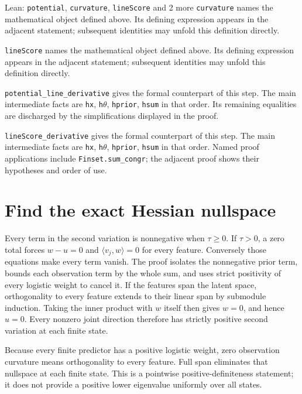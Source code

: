 \documentclass[11pt,a4paper]{article}
\begin{document}
\begin{leanbox}{Lean: \texttt{potential}, \texttt{curvature}, \texttt{lineScore} and 2 more}
\texttt{curvature} names the mathematical object defined above. Its defining expression appears in the adjacent statement; subsequent identities may unfold this definition directly.




\texttt{line\allowbreak{}Score} names the mathematical object defined above. Its defining expression appears in the adjacent statement; subsequent identities may unfold this definition directly.




\texttt{potential\_\allowbreak{}line\_\allowbreak{}derivative} gives the formal counterpart of this step. The main intermediate facts are \texttt{hx}, \texttt{h\ensuremath{\theta}}, \texttt{hprior}, \texttt{hsum} in that order. Its remaining equalities are discharged by the simplifications displayed in the proof.




\texttt{line\allowbreak{}Score\_\allowbreak{}derivative} gives the formal counterpart of this step. The main intermediate facts are \texttt{hx}, \texttt{h\ensuremath{\theta}}, \texttt{hprior}, \texttt{hsum} in that order. Named proof applications include \texttt{Finset.\allowbreak{}sum\_\allowbreak{}congr}; the adjacent proof shows their hypotheses and order of use.
\end{leanbox}

\section{\texorpdfstring{Find the exact Hessian nullspace}{Find the exact Hessian nullspace}}


Every term in the second variation is nonnegative when \(\tau\ge0\). If \(\tau>0\), a zero total forces \(w-u=0\) and \(\langle v_j,w\rangle=0\) for every feature. Conversely those equations make every term vanish. The proof isolates the nonnegative prior term, bounds each observation term by the whole sum, and uses strict positivity of every logistic weight to cancel it. If the features span the latent space, orthogonality to every feature extends to their linear span by submodule induction. Taking the inner product with \(w\) itself then gives \(w=0\), and hence \(u=0\). Every nonzero joint direction therefore has strictly positive second variation at each finite state.



Because every finite predictor has a positive logistic weight, zero observation curvature means orthogonality to every feature. Full span eliminates that nullspace at each finite state. This is a pointwise positive-definiteness statement; it does not provide a positive lower eigenvalue uniformly over all states.
\end{document}
